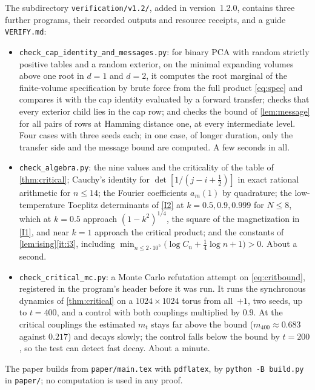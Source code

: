 \documentclass[11pt]{article}
\theoremstyle{plain}
\theoremstyle{definition}
\theoremstyle{remark}
\begin{document}
The subdirectory \texttt{verification/v1.2/}, added in version~1.2.0, contains three further programs, their recorded outputs and resource receipts, and a guide \texttt{VERIFY.md}:
\begin{itemize}
\item \texttt{check\_cap\_identity\_and\_messages.py}: for binary PCA with random strictly positive tables and a random exterior, on the minimal expanding volumes above one root in $d=1$ and $d=2$, it computes the root marginal of the finite-volume specification by brute force from the full product \eqref{eq:spec} and compares it with the cap identity evaluated by a forward transfer; checks that every exterior child lies in the cap row; and checks the bound of \cref{lem:message} for all pairs of rows at Hamming distance one, at every intermediate level. Four cases with three seeds each; in one case, of longer duration, only the transfer side and the message bound are computed. A few seconds in all.
\item \texttt{check\_algebra.py}: the nine values and the criticality of the table of \cref{thm:critical}; Cauchy's identity for $\det[1/(j-i+\frac12)]$ in exact rational arithmetic for $n\le14$; the Fourier coefficients $a_m(1)$ by quadrature; the low-temperature Toeplitz determinants of \ref{I2} at $k=0.5,0.9,0.999$ for $N\le8$, which at $k=0.5$ approach $(1-k^2)^{1/4}$, the square of the magnetization in \ref{I1}, and near $k=1$ approach the critical product; and the constants of \cref{lem:ising}\ref{it:i3}, including $\min_{n\le2\cdot10^5}\bigl(\log C_n+\frac14\log n+1\bigr)>0$. About a second.
\item \texttt{check\_critical\_mc.py}: a Monte Carlo refutation attempt on \eqref{eq:critbound}, registered in the program's header before it was run. It runs the synchronous dynamics of \cref{thm:critical} on a $1024\times1024$ torus from all~$+1$, two seeds, up to $t=400$, and a control with both couplings multiplied by $0.9$. At the critical couplings the estimated $m_t$ stays far above the bound ($m_{400}\approx0.683$ against $0.217$) and decays slowly; the control falls below the bound by $t=200$, so the test can detect fast decay. About a minute.
\end{itemize}
The paper builds from \texttt{paper/main.tex} with \texttt{pdflatex}, by \texttt{python -B build.py} in \texttt{paper/}; no computation is used in any proof.
\end{document}
